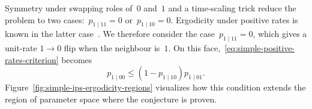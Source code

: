 %
%
%

Symmetry under swapping roles of~$0$ and~$1$ and a time-scaling trick reduce the problem to two cases:~$p_{1\mid11}=0$ or~$p_{1\mid10}=0$. Ergodicity under positive rates
is known in the latter case~\cite[Section~7]{GluchowskiMenz2025}.
We therefore consider the case~$p_{1\mid11}=0$, which gives a unit-rate
$1\to0$ flip when the neighbour is~$1$.
On this face,~\eqref{eq:simple-positive-rates-criterion} becomes
\begin{equation*}
p_{1\mid00}\leq(1-p_{1\mid10})p_{1\mid01}.
\end{equation*}
Figure~\ref{fig:simple-ips-ergodicity-regions} visualizes how this condition extends the region of parameter space where the conjecture is proven.

